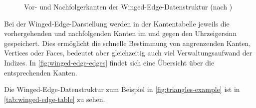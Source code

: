 \begin{figure}[ht]
\centering
{}
\caption{Vor- und Nachfolgerkanten der Winged-Edge-Datenstruktur (nach \cite[S.591]{baumgart1975polyhedron})}
\label{fig:winged-edge-edges}
\end{figure}

Bei der Winged-Edge-Darstellung werden in der Kantentabelle jeweils die vorhergehenden und nachfolgenden Kanten im und gegen den Uhrzeigersinn gespeichert.
Dies ermöglicht die schnelle Bestimmung von angrenzenden Kanten, Vertices oder Faces, bedeutet aber gleichzeitig auch viel Verwaltungsaufwand der Indizes.
In \autoref{fig:winged-edge-edges} findet sich eine Übersicht über die entsprechenden Kanten.

Die Winged-Edge-Datenstruktur zum Beispiel in \autoref{fig:triangles-example} ist in \autoref{tab:winged-edge-table} zu sehen.


